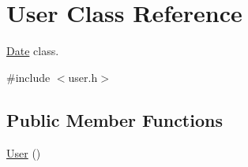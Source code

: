\hypertarget{class_user}{}\section{User Class Reference}
\label{class_user}


\hyperlink{class_date}{Date} class.  




{\ttfamily \#include $<$user.\+h$>$}

\subsection*{Public Member Functions}
\begin{DoxyCompactItemize}
\item 
\hypertarget{class_user_a4a0137053e591fbb79d9057dd7d2283d}{}\hyperlink{class_user_a4a0137053e591fbb79d9057dd7d2283d}{User} ()\label{class_user_a4a0137053e591fbb79d9057dd7d2283d}


\end{DoxyCompactItemize}
